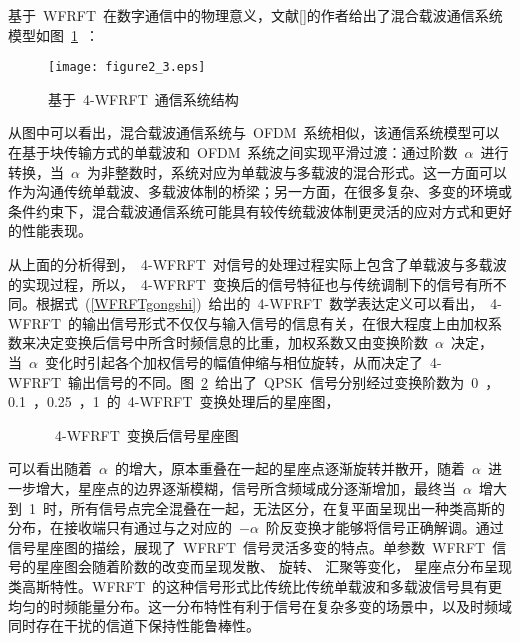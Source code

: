 基于~WFRFT~在数字通信中的物理意义，文献[]的作者给出了混合载波通信系统模型如图~\ref{xitongjiegou}~：
\begin{figure}[htbp]
\centering
\texttt{[image: figure2\_3.eps]}
\caption{基于~4-WFRFT~通信系统结构}\vspace{-1em}\label{xitongjiegou}
\end{figure}

从图中可以看出，混合载波通信系统与~OFDM~系统相似，该通信系统模型可以在基于块传输方式的单载波和~OFDM~系统之间实现平滑过渡：通过阶数~$\alpha$~进行转换，当~$\alpha$~为非整数时，系统对应为单载波与多载波的混合形式。这一方面可以作为沟通传统单载波、多载波体制的桥梁；另一方面，在很多复杂、多变的环境或条件约束下，混合载波通信系统可能具有较传统载波体制更灵活的应对方式和更好的性能表现。

从上面的分析得到，~4-WFRFT~对信号的处理过程实际上包含了单载波与多载波的实现过程，所以，~4-WFRFT~变换后的信号特征也与传统调制下的信号有所不同。根据式~(\ref{WFRFTgongshi})~给出的~4-WFRFT~数学表达定义可以看出，~4-WFRFT~的输出信号形式不仅仅与输入信号的信息有关，在很大程度上由加权系数来决定变换后信号中所含时频信息的比重，加权系数又由变换阶数~$\alpha$~决定，当~$\alpha$~变化时引起各个加权信号的幅值伸缩与相位旋转，从而决定了~4-WFRFT~输出信号的不同。图~\ref{xingzuotu}~给出了~QPSK~信号分别经过变换阶数为~0~，0.1~，0.25~，1~的~4-WFRFT~变换处理后的星座图，
\begin{figure}[htbp]
\centering
\subfigure{\label{xingzuo1}}\addtocounter{subfigure}{-2}
\subfigure{\label{xingzuo2}}\addtocounter{subfigure}{-2}
\subfigure{\label{xingzuo3}}\addtocounter{subfigure}{-2}
\subfigure{\label{xingzuo4}}\addtocounter{subfigure}{-2}
\caption{~4-WFRFT~变换后信号星座图}\label{xingzuotu}\vspace{-1em}
\end{figure}
可以看出随着~$\alpha$~的增大，原本重叠在一起的星座点逐渐旋转并散开，随着~$\alpha$~进一步增大，星座点的边界逐渐模糊，信号所含频域成分逐渐增加，最终当~$\alpha$~增大到~1~时，所有信号点完全混叠在一起，无法区分，在复平面呈现出一种类高斯的分布，在接收端只有通过与之对应的~$-\alpha$~阶反变换才能够将信号正确解调。通过信号星座图的描绘，展现了~WFRFT~信号灵活多变的特点。单参数~WFRFT~信号的星座图会随着阶数的改变而呈现发散、 旋转、 汇聚等变化， 星座点分布呈现类高斯特性。WFRFT~的这种信号形式比传统比传统单载波和多载波信号具有更均匀的时频能量分布。这一分布特性有利于信号在复杂多变的场景中，以及时频域同时存在干扰的信道下保持性能鲁棒性。
